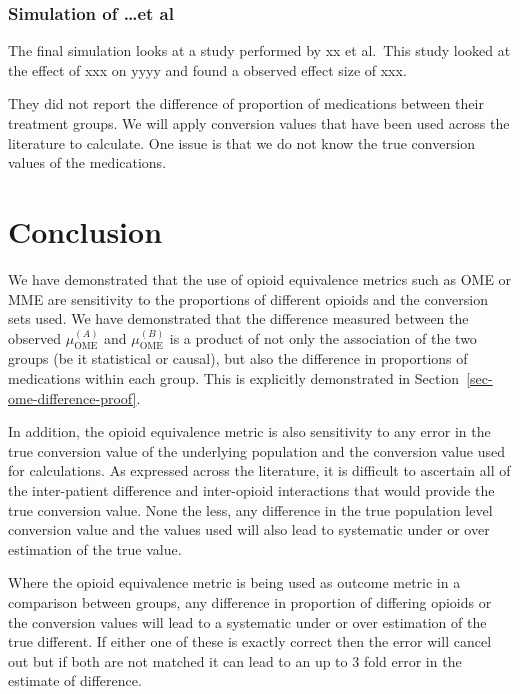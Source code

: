 \documentclass[
  letterpaper,
  DIV=11,
  numbers=noendperiod]{scrreprt}
\begin{document}
\subsection{Simulation of \ldots et al}\label{simulation-of-et-al}

The final simulation looks at a study performed by xx et al.~This study
looked at the effect of xxx on yyyy and found a observed effect size of
xxx.

They did not report the difference of proportion of medications between
their treatment groups. We will apply conversion values that have been
used across the literature to calculate. One issue is that we do not
know the true conversion values of the medications.


\chapter{Conclusion}\label{conclusion}

We have demonstrated that the use of opioid equivalence metrics such as
OME or MME are sensitivity to the proportions of different opioids and
the conversion sets used. We have demonstrated that the difference
measured between the observed \(\mu_{\text{OME}}^{(A)}\) and
\(\mu_{\text{OME}}^{(B)}\) is a product of not only the association of
the two groups (be it statistical or causal), but also the difference in
proportions of medications within each group. This is explicitly
demonstrated in Section~\ref{sec-ome-difference-proof}.

In addition, the opioid equivalence metric is also sensitivity to any
error in the true conversion value of the underlying population and the
conversion value used for calculations. As expressed across the
literature, it is difficult to ascertain all of the inter-patient
difference and inter-opioid interactions that would provide the true
conversion value. None the less, any difference in the true population
level conversion value and the values used will also lead to systematic
under or over estimation of the true value.

Where the opioid equivalence metric is being used as outcome metric in a
comparison between groups, any difference in proportion of differing
opioids or the conversion values will lead to a systematic under or over
estimation of the true different. If either one of these is exactly
correct then the error will cancel out but if both are not matched it
can lead to an up to 3 fold error in the estimate of difference.
\end{document}
